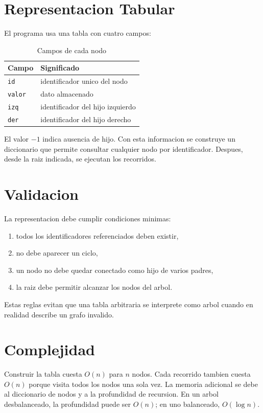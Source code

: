 \documentclass[conference]{IEEEtran}
\begin{document}
\section{Representacion Tabular}
El programa usa una tabla con cuatro campos:
\begin{table}[htbp]
\caption{Campos de cada nodo}
\centering
\begin{tabular}{ll}
\toprule
Campo & Significado \\
\midrule
\texttt{id} & identificador unico del nodo \\
\texttt{valor} & dato almacenado \\
\texttt{izq} & identificador del hijo izquierdo \\
\texttt{der} & identificador del hijo derecho \\
\bottomrule
\end{tabular}
\end{table}

El valor $-1$ indica ausencia de hijo. Con esta informacion se construye un
diccionario que permite consultar cualquier nodo por identificador. Despues,
desde la raiz indicada, se ejecutan los recorridos.

\section{Validacion}
La representacion debe cumplir condiciones minimas:
\begin{enumerate}
\item todos los identificadores referenciados deben existir,
\item no debe aparecer un ciclo,
\item un nodo no debe quedar conectado como hijo de varios padres,
\item la raiz debe permitir alcanzar los nodos del arbol.
\end{enumerate}
Estas reglas evitan que una tabla arbitraria se interprete como arbol cuando
en realidad describe un grafo invalido.

\section{Complejidad}
Construir la tabla cuesta $O(n)$ para $n$ nodos. Cada recorrido tambien cuesta
$O(n)$ porque visita todos los nodos una sola vez. La memoria adicional se
debe al diccionario de nodos y a la profundidad de recursion. En un arbol
desbalanceado, la profundidad puede ser $O(n)$; en uno balanceado, $O(\log n)$.
\end{document}
